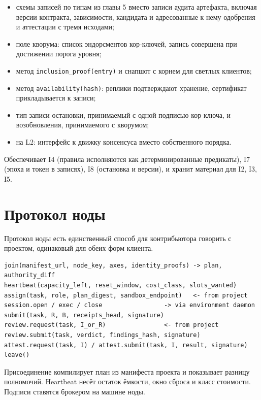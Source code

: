 \begin{exbox}
\begin{itemize}
\item схемы записей по типам из главы 5 вместо записи аудита артефакта, включая версии контракта, зависимости, кандидата и адресованные к нему одобрения и аттестации с тремя исходами;
\item поле кворума: список эндорсментов кор-ключей, запись совершена при достижении порога уровня;
\item метод \texttt{inclusion\_proof(entry)} и снапшот с корнем для светлых клиентов;
\item метод \texttt{availability(hash)}: реплики подтверждают хранение, сертификат прикладывается к записи;
\item тип записи остановки, принимаемый с одной подписью кор-ключа, и возобновления, принимаемого с кворумом;
\item на L2: интерфейс к движку консенсуса вместо собственного порядка.
\end{itemize}
\end{exbox}

Обеспечивает I4 (правила исполняются как детерминированные предикаты), I7 (эпоха и токен в записях), I8 (остановка и версии), и хранит материал для I2, I3, I5.

\section{Протокол ноды}

Протокол ноды есть единственный способ для контрибьютора говорить с проектом, одинаковый для обеих форм клиента.

\begin{exbox}[Сообщения]
\begin{lstlisting}
join(manifest_url, node_key, axes, identity_proofs) -> plan, authority_diff
heartbeat(capacity_left, reset_window, cost_class, slots_wanted)
assign(task, role, plan_digest, sandbox_endpoint)   <- from project
session.open / exec / close                 -> via environment daemon
submit(task, R, B, receipts_head, signature)
review.request(task, I_or_R)                <- from project
review.submit(task, verdict, findings_hash, signature)
attest.request(task, I) / attest.submit(task, I, result, signature)
leave()
\end{lstlisting}
\end{exbox}

Присоединение компилирует план из манифеста проекта и показывает разницу полномочий. Heartbeat несёт остаток ёмкости, окно сброса и класс стоимости. Подписи ставятся брокером на машине ноды.

